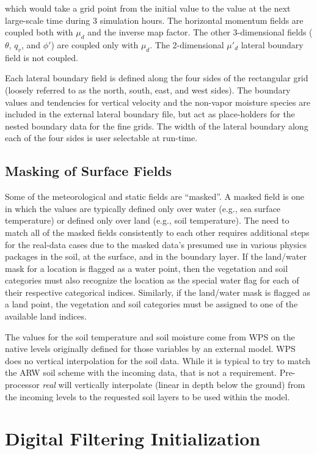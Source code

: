 \noindent which would take a grid point from the initial value to the value at the next large-scale time 
during 3 simulation hours.
The horizontal momentum fields are coupled both with  $\mu_d$ and the inverse map factor.  The 
other 3-dimensional fields ($\theta$, $q_v$, and $\phi'$) are coupled only with $\mu_d$.
The 2-dimensional $\mu'_d$ lateral boundary field is not coupled.

Each lateral boundary field
is defined along the four sides of the 
rectangular grid (loosely referred to as the north, south, east, and west sides).  
The boundary values and tendencies for vertical velocity and the non-vapor moisture species are included
in the external lateral boundary file, but act as
place-holders for the nested boundary data for the fine grids.
The width of the lateral
boundary along each of the four sides is user selectable at run-time.

\subsection{Masking of Surface Fields}

Some of the meteorological and static fields are ``masked''.  A masked field is one in which
the values are typically defined only over water (e.g., sea surface temperature) or defined
only over land (e.g., soil temperature).
The need to match all of the masked fields consistently to each other requires additional steps
for the real-data cases due to the masked data's presumed use in various physics packages in the soil, 
at the surface, and in the boundary layer.
If the land/water
mask for a location is flagged as a water point, then the vegetation and soil categories must also
recognize the location as the special water flag for each of their respective categorical indices.  
Similarly, if the land/water mask is flagged as a land point, the vegetation and soil
categories must be assigned to one of the available land indices.

The values for the soil temperature and soil moisture come from WPS on the 
native levels originally defined for those variables
by an external model.  WPS does no vertical interpolation for the
soil data.   While it is typical to try to match the ARW soil scheme with
the incoming data, that is not a requirement.  Pre-processor {\it real} will vertically interpolate 
(linear in depth below the ground) from the incoming levels to the requested soil layers to be
used within the model.

\section{Digital Filtering Initialization}

